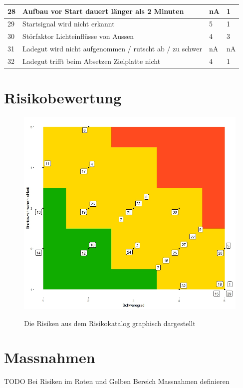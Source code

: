 \documentclass[a4paper]{report}
\begin{document}
\noindent
\begin{tabular}{|p{}|p{}|p{}|p{}|}
	\hline
	28 & Aufbau vor Start dauert länger als 2 Minuten & nA & 1 \\
	\hline
	29 & Startsignal wird nicht erkannt & 5 & 1 \\
	\hline
	30 & Störfaktor Lichteinflüsse von Aussen & 4 & 3 \\
	\hline
	31 & Ladegut wird nicht aufgenommen / rutscht ab / zu schwer & nA & nA \\
	\hline
	32 & Ladegut trifft beim Absetzen Zielplatte nicht & 4 & 1 \\
	\hline
\end{tabular}

\section{Risikobewertung}

\begin{figure}[h!]
	\centering
	\includegraphics[width=\textwidth,keepaspectratio]{Risikomatrix}
	\label{fig:Risikomatrix}
	\caption{Die Risiken aus dem Risikokatalog graphisch dargestellt}
\end{figure}

\section{Massnahmen}
TODO Bei Risiken im Roten und Gelben Bereich Massnahmen definieren
\end{document}
